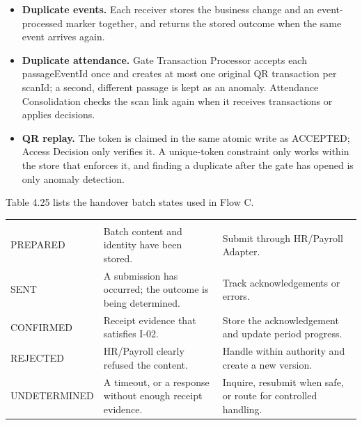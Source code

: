 \begin{itemize}[leftmargin=36pt, itemsep=2pt, topsep=4pt, parsep=2pt]
  \item \textbf{Duplicate events.} Each receiver stores the business change and an event-processed marker together, and returns the stored outcome when the same event arrives again.
  \item \textbf{Duplicate attendance.} Gate Transaction Processor accepts each passageEventId once and creates at most one original QR transaction per scanId; a second, different passage is kept as an anomaly. Attendance Consolidation checks the scan link again when it receives transactions or applies decisions.
  \item \textbf{QR replay.} The token is claimed in the same atomic write as ACCEPTED; Access Decision only verifies it. A unique-token constraint only works within the store that enforces it, and finding a duplicate after the gate has opened is only anomaly detection.
\end{itemize}

Table 4.25 lists the handover batch states used in Flow C.

\begin{longtable}{|>{\raggedright\arraybackslash}p{108.5pt}|>{\raggedright\arraybackslash}p{129.5pt}|>{\raggedright\arraybackslash}p{171.5pt}|}
\hline
\multicolumn{1}{|>{\columncolor{tableheader}\centering\arraybackslash}p{108.5pt}|}{\textbf{State}} & \multicolumn{1}{>{\columncolor{tableheader}\centering\arraybackslash}p{129.5pt}|}{\textbf{Meaning}} & \multicolumn{1}{>{\columncolor{tableheader}\centering\arraybackslash}p{171.5pt}|}{\textbf{Handling}} \\
\hline
\endhead
\multicolumn{3}{c}{\rule{0pt}{20pt}\normalsize\textbf{Table 4.25. Handover Batch States}} \\
\endlastfoot
PREPARED & Batch content and identity have been stored. & Submit through HR/Payroll Adapter. \\
\hline
SENT & A submission has occurred; the outcome is being determined. & Track acknowledgements or errors. \\
\hline
CONFIRMED & Receipt evidence that satisfies I-02. & Store the acknowledgement and update period progress. \\
\hline
REJECTED & HR/Payroll clearly refused the content. & Handle within authority and create a new version. \\*
\hline\noalign{\nobreak}
UNDETERMINED & A timeout, or a response without enough receipt evidence. & Inquire, resubmit when safe, or route for controlled handling. \\
\hline
\end{longtable}


